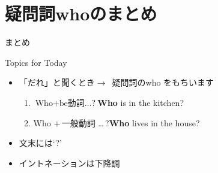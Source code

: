 \documentclass[aspectratio=169]{beamer}
\begin{document}
\section{疑問詞whoのまとめ}
\begin{frame}[plain]{まとめ}
 
\begin{block}{Topics for Today}
\pause
\begin{itemize}[square]\small
 \item 「だれ」と聞くとき$\longrightarrow$\,\,\,疑問詞のwho  をもちいます
        \begin{enumerate}[circle]
	 \item $\text{Who}+\text{be動詞\ldots ?}$\hfill{\scriptsize \textbf{Who} is in the kitchen?}
	 \item Who $+\,\text{一般動詞}$ \ldots\,?\hfill{\scriptsize \textbf{Who} lives in the house?}
	\end{enumerate}
 \item 文末には`?'
 \item イントネーションは下降調\,\myDownwardPitch{}\,\,
\end{itemize}
     \end{block}
\end{frame}
\end{document}
